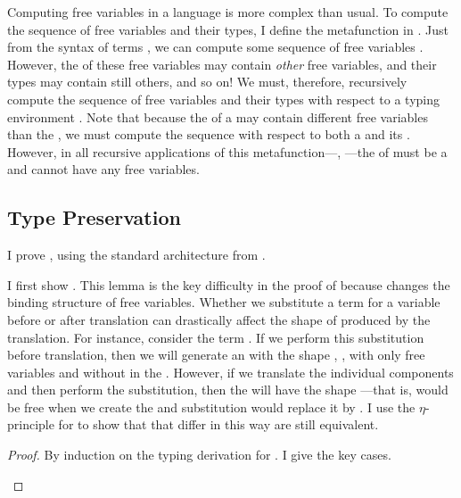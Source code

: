 {\FigDFVs
Computing free variables in a  language is more complex
than usual.
To compute the sequence of free variables and their types, I define the
metafunction \im{\DFV{\slenv}{\se,\sB}} in .
Just from the syntax of terms \im{\se,\sB}, we can compute some sequence of free
variables .
However, the  of these free variables 
may contain \emph{other} free variables, and their types may contain still
others, and so on!
We must, therefore, recursively compute the sequence of free variables and
their types with respect to a typing environment \im{\slenv}.
Note that because the  \im{\sB} of a  \im{\se} may contain
different free variables than the , we must compute the sequence with
respect to both a  and its .
However, in all recursive applications of this metafunction---\eg,
---the  of  must be a
 and cannot have any free variables.

\subsection{Type Preservation}
\label{sec:abs-cc:cc:type-pres}
I prove , using the standard architecture from
.

I first show .
This lemma is the key difficulty in the proof of 
because  changes the binding structure of free
variables.
Whether we substitute a term for a variable before or after translation can
drastically affect the shape of  produced by the translation.
For instance, consider the term \im{\subst{(\sfune{\sy}{\sA}{\se})}{\sepr}{\sx}}.
If we perform this substitution before translation, then we will generate an
 with the shape , \ie,
with only free variables and without \im{\tx} in the .
However, if we translate the individual components and then perform the
substitution, then the  will have the shape
---that is, \im{\tx} would
be free when we create the  and substitution would replace it
by \im{\cctrans{\sepr}}.
I use the \(\eta\)-principle for  to show that 
that differ in this way are still equivalent.
\begin{lemma}[Compositionality]
  \label{lem:abs-cc:cc:subst}
  \im{\cctrans{(\subst{\seone}{\setwo}{\sx})} \equiv \subst{\cctrans{\seone}}{\cctrans{\setwo}}{\sx}}
\end{lemma}
\begin{proof}
  By induction on the typing derivation for \im{\seone}. I give the key cases.
  \begin{proofcases}
    \item {}


\end{proofcases}
\end{proof}}
